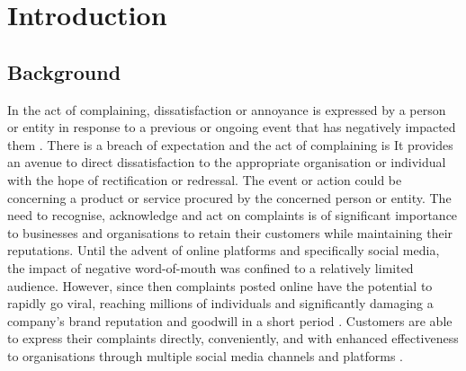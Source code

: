 \chapter{Introduction}

\section{Background}
In the act of complaining, dissatisfaction or annoyance is expressed by a person or entity in response to a previous or ongoing event that has negatively impacted them \cite{olshtain_speechact_1987}. There is a breach of expectation and the act of complaining is It provides an avenue to direct dissatisfaction to the appropriate organisation or individual with the hope of rectification or redressal. The event or action could be concerning a product or service procured by the concerned person or entity. The need to recognise, acknowledge and act on complaints is of significant importance to businesses and organisations to retain their customers while maintaining their reputations. 
\newline \newline
Until the advent of online platforms and specifically social media, the impact of negative word-of-mouth was confined to a relatively limited audience. However, since then complaints posted online have the potential to rapidly go viral, reaching millions of individuals and significantly damaging a company's brand reputation and goodwill in a short period \cite{tripp_when_2011}. Customers are able to express their complaints directly, conveniently, and with enhanced effectiveness to organisations through multiple social media channels and platforms \cite{balaji_customer_2015}.

